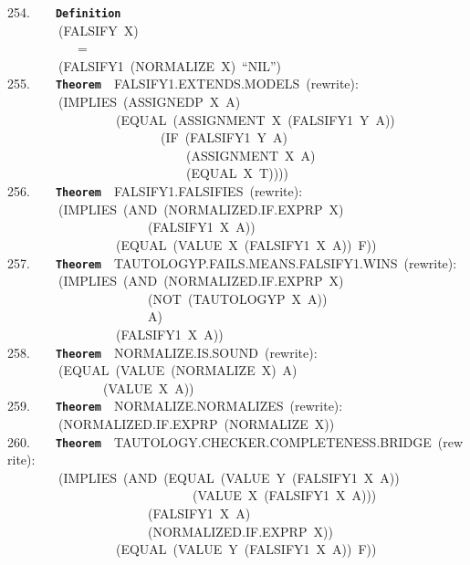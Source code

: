\documentclass[11pt]{book}
\newenvironment{pubasis}{\begin{flushleft}\ttfamily\small}{\normalsize\rmfamily\end{flushleft}}
\newcommand{\axiomordefinition}[1]{\vspace{6pt}\texttt{\textbf{#1}}}
\begin{document}
\begin{pubasis}
254.~~~~\axiomordefinition{Definition}\\
~~~~~~~~(FALSIFY~X)\\
~~~~~~~~~~~=\\
~~~~~~~~(FALSIFY1~(NORMALIZE~X)~``NIL'')\\

255.~~~~\axiomordefinition{Theorem}~~FAL\-SI\-FY1.EXTENDS.MODELS~(rewrite):\\
~~~~~~~~(IMPLIES~(ASSIGNEDP~X~A)\\
~~~~~~~~~~~~~~~~~(EQUAL~(ASSIGNMENT~X~(FALSIFY1~Y~A))\\
~~~~~~~~~~~~~~~~~~~~~~~~(IF~(FALSIFY1~Y~A)\\
~~~~~~~~~~~~~~~~~~~~~~~~~~~~(ASSIGNMENT~X~A)\\
~~~~~~~~~~~~~~~~~~~~~~~~~~~~(EQUAL~X~T))))\\

256.~~~~\axiomordefinition{Theorem}~~FAL\-SI\-FY1.FALSIFIES~(rewrite):\\
~~~~~~~~(IMPLIES~(AND~(NOR\-MAL\-IZED.IF.EXPRP~X)\\
~~~~~~~~~~~~~~~~~~~~~~(FALSIFY1~X~A))\\
~~~~~~~~~~~~~~~~~(EQUAL~(VALUE~X~(FALSIFY1~X~A))~F))\\

257.~~~~\axiomordefinition{Theorem}~~TAU\-TOL\-OGYP.FAILS.MEANS.FAL\-SI\-FY1.WINS~(rewrite):\\
~~~~~~~~(IMPLIES~(AND~(NOR\-MAL\-IZED.IF.EXPRP~X)\\
~~~~~~~~~~~~~~~~~~~~~~(NOT~(TAUTOLOGYP~X~A))\\
~~~~~~~~~~~~~~~~~~~~~~A)\\
~~~~~~~~~~~~~~~~~(FALSIFY1~X~A))\\

258.~~~~\axiomordefinition{Theorem}~~NOR\-MAL\-IZE.IS.SOUND~(rewrite):\\
~~~~~~~~(EQUAL~(VALUE~(NORMALIZE~X)~A)\\
~~~~~~~~~~~~~~~(VALUE~X~A))\\

259.~~~~\axiomordefinition{Theorem}~~NOR\-MAL\-IZE.NOR\-MAL\-IZES~(rewrite):\\
~~~~~~~~(NOR\-MAL\-IZED.IF.EXPRP~(NOR\-MAL\-IZE~X))\\

260.~~~~\axiomordefinition{Theorem}~~TAU\-TOL\-OGY.CHECK\-ER.COMPLETENESS.BRIDGE~(rewrite):\\
~~~~~~~~(IMPLIES~(AND~(EQUAL~(VALUE~Y~(FALSIFY1~X~A))\\
~~~~~~~~~~~~~~~~~~~~~~~~~~~~~(VALUE~X~(FALSIFY1~X~A)))\\
~~~~~~~~~~~~~~~~~~~~~~(FALSIFY1~X~A)\\
~~~~~~~~~~~~~~~~~~~~~~(NOR\-MAL\-IZED.IF.EXPRP~X))\\
~~~~~~~~~~~~~~~~~(EQUAL~(VALUE~Y~(FALSIFY1~X~A))~F))\\


\end{pubasis}
\end{document}
